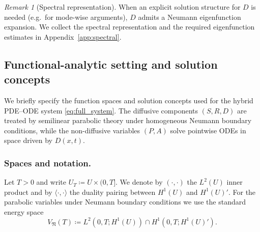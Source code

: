 \documentclass[pdflatex,sn-mathphys-ay]{sn-jnl}
\theoremstyle{thmstyleone}
\theoremstyle{definition}
\theoremstyle{remark}
\newtheorem{remark}[theorem]{Remark}
\begin{document}
\begin{remark}[Spectral representation]
When an explicit solution structure for $D$ is needed (e.g.\ for mode-wise arguments), $D$ admits a Neumann eigenfunction expansion.
We collect the spectral representation and the required eigenfunction estimates in Appendix~\ref{app:spectral}.    
\end{remark}

\subsection{Functional-analytic setting and solution concepts}
\label{subsec:functional_setting}

We briefly specify the function spaces and solution concepts used for the hybrid PDE--ODE system \eqref{eq:full_system}.
The diffusive components $(S,R,D)$ are treated by semilinear parabolic theory under homogeneous Neumann boundary conditions,
while the non-diffusive variables $(P,A)$ solve pointwise ODEs in space driven by $D(x,t)$.

\subsubsection{Spaces and notation.}
Let $T>0$ and write $U_T\coloneqq U\times(0,T]$.
We denote by $(\cdot,\cdot)$ the $L^2(U)$ inner product and by $\langle\cdot,\cdot\rangle$ the duality pairing between
$H^1(U)$ and $H^1(U)'$.
For the parabolic variables under Neumann boundary conditions we use the standard energy space
\begin{equation}
\label{eq:V_space}
V_{\mathfrak{N}}(T)\coloneqq L^2(0,T;H^1(U))\cap H^1(0,T;H^1(U)').
\end{equation}
\end{document}
